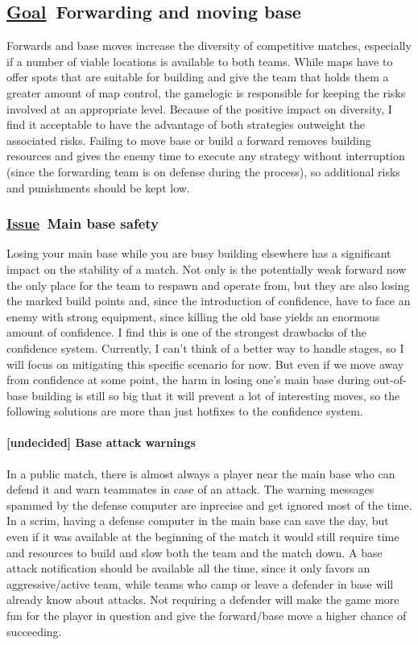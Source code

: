 \documentclass{scrartcl}
\newcommand{\goal}     [0]{\textbf{\underline{Goal}\ }}
\newcommand{\issue}    [0]{\textbf{\underline{Issue}\ }}
\newcommand{\undecided}[0]{\textcolor{undecided}{\textbf{[undecided] }}}
\begin{document}
\subsection{\goal Forwarding and moving base}

Forwards and base moves increase the diversity of competitive matches, especially if a number of viable locations is available to both teams. While maps have to offer spots that are suitable for building and give the team that holds them a greater amount of map control, the gamelogic is responsible for keeping the risks involved at an appropriate level. Because of the positive impact on diversity, I find it acceptable to have the advantage of both strategies outweight the associated risks. Failing to move base or build a forward removes building resources and gives the enemy time to execute any strategy without interruption (since the forwarding team is on defense during the process), so additional risks and punishments should be kept low.

\subsubsection{\issue Main base safety}

Losing your main base while you are busy building elsewhere has a significant impact on the stability of a match. Not only is the potentially weak forward now the only place for the team to respawn and operate from, but they are also losing the marked build points and, since the introduction of confidence, have to face an enemy with strong equipment, since killing the old base yields an enormous amount of confidence. I find this is one of the strongest drawbacks of the confidence system. Currently, I can't think of a better way to handle stages, so I will focus on mitigating this specific scenario for now. But even if we move away from confidence at some point, the harm in losing one's main base during out-of-base building is still so big that it will prevent a lot of interesting moves, so the following solutions are more than just hotfixes to the confidence system.

\paragraph{\undecided Base attack warnings}

In a public match, there is almost always a player near the main base who can defend it and warn teammates in case of an attack. The warning messages spammed by the defense computer are inprecise and get ignored most of the time. In a scrim, having a defense computer in the main base can save the day, but even if it was available at the beginning of the match it would still require time and resources to build and slow both the team and the match down. A base attack notification should be available all the time, since it only favors an aggressive/active team, while teams who camp or leave a defender in base will already know about attacks. Not requiring a defender will make the game more fun for the player in question and give the forward/base move a higher chance of succeeding.
\end{document}

